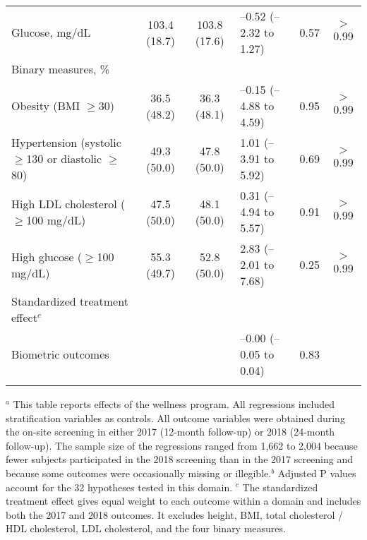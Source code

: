 \documentclass{article}
\begin{document}
\begin{table}[tbp]
{\begin{tabularx}{\linewidth}{lCClCC}
\hspace{2em} Glucose, mg/dL&103.4  (18.7)&103.8  (17.6)&--0.52 (--2.32 to 1.27)&0.57&$>$0.99 \tabularnewline
\hspace{1em} Binary measures, \%&&&&& \tabularnewline
\hspace{2em} Obesity (BMI $\geq$30)&36.5  (48.2)&36.3  (48.1)&--0.15 (--4.88 to 4.59)&0.95&$>$0.99 \tabularnewline
\hspace{2em} Hypertension (systolic $\geq$130 or diastolic $\geq$80)&49.3  (50.0)&47.8  (50.0)&1.01 (--3.91 to 5.92)&0.69&$>$0.99 \tabularnewline
\hspace{2em} High LDL cholesterol ($\geq$100 mg/dL)&47.5  (50.0)&48.1  (50.0)&0.31 (--4.94 to 5.57)&0.91&$>$0.99 \tabularnewline
\hspace{2em} High glucose ($\geq$100 mg/dL)&55.3  (49.7)&52.8  (50.0)&2.83 (--2.01 to 7.68)&0.25&$>$0.99 \tabularnewline
Standardized treatment effect$^{c}$&&&&& \tabularnewline
\hspace{1em} Biometric outcomes&&&--0.00 (--0.05 to 0.04)&0.83& \tabularnewline
\bottomrule \addlinespace[\belowrulesep]

\end{tabularx}
\begin{flushleft}
\tiny $^{a}$ This table reports effects of the wellness program. All regressions included stratification variables as controls. All outcome variables were obtained during the on-site screening in either 2017 (12-month follow-up) or 2018 (24-month follow-up). The sample size of the regressions ranged from 1,662 to 2,004 because fewer subjects participated in the 2018 screening than in the 2017 screening and because some outcomes were occasionally missing or illegible.\newline $^{b}$ Adjusted P values account for the 32 hypotheses tested in this domain. \newline $^{c}$ The standardized treatment effect gives equal weight to each outcome within a domain and includes both the 2017 and 2018 outcomes. It excludes height, BMI, total cholesterol / HDL cholesterol, LDL cholesterol, and the four binary measures.
\end{flushleft}
}
\end{table}
\end{document}
